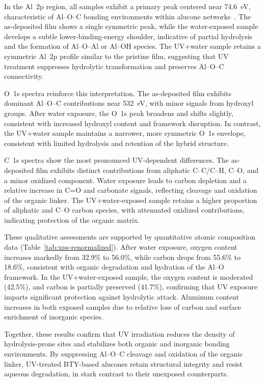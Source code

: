 In the Al~2p region, all samples exhibit a primary peak centered near 74.6~eV, characteristic of Al–O–C bonding environments within alucone networks~\cite{REF}. The as-deposited film shows a single symmetric peak, while the water-exposed sample develops a subtle lower-binding-energy shoulder, indicative of partial hydrolysis and the formation of Al–O–Al or Al–OH species. The UV+water sample retains a symmetric Al~2p profile similar to the pristine film, suggesting that UV treatment suppresses hydrolytic transformation and preserves Al–O–C connectivity.

O~1s spectra reinforce this interpretation. The as-deposited film exhibits dominant Al–O–C contributions near 532~eV, with minor signals from hydroxyl groups. After water exposure, the O~1s peak broadens and shifts slightly, consistent with increased hydroxyl content and framework disruption. In contrast, the UV+water sample maintains a narrower, more symmetric O~1s envelope, consistent with limited hydrolysis and retention of the hybrid structure.

C~1s spectra show the most pronounced UV-dependent differences. The as-deposited film exhibits distinct contributions from aliphatic C–C/C–H, C–O, and a minor oxidized component. Water exposure leads to carbon depletion and a relative increase in C=O and carbonate signals, reflecting cleavage and oxidation of the organic linker. The UV+water-exposed sample retains a higher proportion of aliphatic and C–O carbon species, with attenuated oxidized contributions, indicating protection of the organic matrix.

These qualitative assessments are supported by quantitative atomic composition data (Table~\ref{tab:xps-renormalized}). After water exposure, oxygen content increases markedly from 32.9\% to 56.0\%, while carbon drops from 55.6\% to 18.6\%, consistent with organic degradation and hydration of the Al–O framework. In the UV+water-exposed sample, the oxygen content is moderated (42.5\%), and carbon is partially preserved (41.7\%), confirming that UV exposure imparts significant protection against hydrolytic attack. Aluminum content increases in both exposed samples due to relative loss of carbon and surface enrichment of inorganic species.

Together, these results confirm that UV irradiation reduces the density of hydrolysis-prone sites and stabilizes both organic and inorganic bonding environments. By suppressing Al–O–C cleavage and oxidation of the organic linker, UV-treated BTY-based alucones retain structural integrity and resist aqueous degradation, in stark contrast to their unexposed counterparts.


